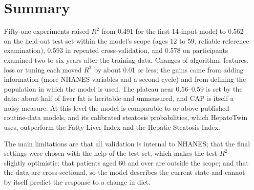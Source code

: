 \section{Summary}
\label{sec:exp-summary}

Fifty-one experiments raised $R^2$ from 0.491 for the first 14-input model to 0.562 on the held-out test set within the model's scope (ages 12 to 59, reliable reference examination), 0.593 in repeated cross-validation, and 0.578 on participants examined two to six years after the training data. Changes of algorithm, features, loss or tuning each moved $R^2$ by about 0.01 or less; the gains came from adding information (more NHANES variables and a second cycle) and from defining the population in which the model is used. The plateau near 0.56--0.59 is set by the data: about half of liver fat is heritable and unmeasured, and CAP is itself a noisy measure. At this level the model is comparable to or above published routine-data models, and its calibrated steatosis probabilities, which HepatoTwin uses, outperform the Fatty Liver Index and the Hepatic Steatosis Index.

The main limitations are that all validation is internal to NHANES; that the final settings were chosen with the help of the test set, which makes the test $R^2$ slightly optimistic; that patients aged 60 and over are outside the scope; and that the data are cross-sectional, so the model describes the current state and cannot by itself predict the response to a change in diet.